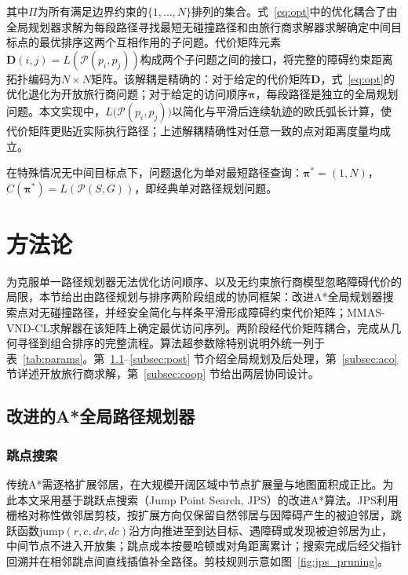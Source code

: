 \documentclass[lettersize,journal]{IEEEtran}
\begin{document}
其中$\Pi$为所有满足边界约束的$\{1, \dots, N\}$排列的集合。式~\textcolor{blue}{\eqref{eq:opt}}中的优化耦合了由全局规划器求解为每段路径寻找最短无碰撞路径和由旅行商求解器求解确定中间目标点的最优排序这两个互相作用的子问题。代价矩阵元素$\mathbf{D}(i, j) = L(\mathcal{P}(p_i, p_j))$构成两个子问题之间的接口，将完整的障碍约束距离拓扑编码为$N \times N$矩阵。该解耦是精确的：对于给定的代价矩阵$\mathbf{D}$，式~\textcolor{blue}{\eqref{eq:opt}}的优化退化为开放旅行商问题；对于给定的访问顺序$\bm{\pi}$，每段路径是独立的全局规划问题。本文实现中，$L\big(\mathcal{P}(p_i, p_j)\big)$以简化与平滑后连续轨迹的欧氏弧长计算，使代价矩阵更贴近实际执行路径；上述解耦精确性对任意一致的点对距离度量均成立。

在特殊情况无中间目标点下，问题退化为单对最短路径查询：$\bm{\pi}^{*} = (1, N)$，$C(\bm{\pi}^{*}) = L(\mathcal{P}(S, G))$，即经典单对路径规划问题。

\section{方法论}

\label{sec:method}

为克服单一路径规划器无法优化访问顺序、以及无约束旅行商模型忽略障碍代价的局限，本节给出由路径规划与排序两阶段组成的协同框架：改进A*全局规划器搜索点对无碰撞路径，并经安全简化与样条平滑形成障碍约束代价矩阵；MMAS-VND-CL求解器在该矩阵上确定最优访问序列。两阶段经代价矩阵耦合，完成从几何寻径到组合排序的完整流程。算法超参数除特别说明外统一列于表~\textcolor{blue}{\ref{tab:params}}。第~\textcolor{blue}{\ref{subsec:jps}}--\textcolor{blue}{\ref{subsec:post}} 节介绍全局规划及后处理，第~\textcolor{blue}{\ref{subsec:aco}} 节详述开放旅行商求解，第~\textcolor{blue}{\ref{subsec:coop}} 节给出两层协同设计。

\subsection{改进的A*全局路径规划器}

\label{subsec:jps}

\subsubsection{跳点搜索}

传统A*需逐格扩展邻居，在大规模开阔区域中节点扩展量与地图面积成正比。为此本文采用基于跳跃点搜索（Jump Point Search, JPS）的改进A*算法\textcolor{blue}{\cite{ref11,ref12}}。JPS利用栅格对称性做邻居剪枝，按扩展方向仅保留自然邻居与因障碍产生的被迫邻居，跳跃函数$\mathrm{jump}(r, c, dr, dc)$沿方向推进至到达目标、遇障碍或发现被迫邻居为止，中间节点不进入开放集；跳点成本按曼哈顿或对角距离累计；搜索完成后经父指针回溯并在相邻跳点间直线插值补全路径。剪枝规则示意如图~\textcolor{blue}{\ref{fig:jps_pruning}}。
\end{document}
